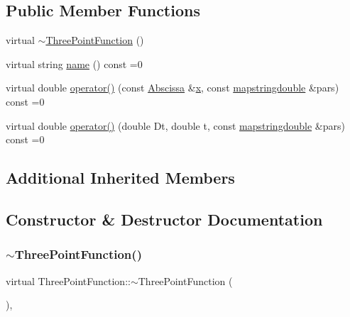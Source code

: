 \subsection*{Public Member Functions}
\begin{DoxyCompactItemize}
\item 
virtual \mbox{\hyperlink{classThreePointFunction_a0b8feef61409d9ad30c9296b6d137e3b}{$\sim$\+Three\+Point\+Function}} ()
\item 
virtual string \mbox{\hyperlink{classThreePointFunction_a4231093b53df2f82f4821a663ac8249f}{name}} () const =0
\item 
virtual double \mbox{\hyperlink{classThreePointFunction_a02550dd7bdee83aab6967d304bb40ff1}{operator()}} (const \mbox{\hyperlink{classAbscissa}{Abscissa}} \&\mbox{\hyperlink{old__edb_8cc_a63584b830e7aaacb521b11b72291a4bc}{x}}, const \mbox{\hyperlink{lib_2fitting__lib_2includes_8h_a647b481c557c7966517f753340a81d13}{mapstringdouble}} \&pars) const =0
\item 
virtual double \mbox{\hyperlink{classThreePointFunction_aa8a937bb564124ba5852898cd47e9fb3}{operator()}} (double Dt, double t, const \mbox{\hyperlink{lib_2fitting__lib_2includes_8h_a647b481c557c7966517f753340a81d13}{mapstringdouble}} \&pars) const =0
\end{DoxyCompactItemize}
\subsection*{Additional Inherited Members}


\subsection{Constructor \& Destructor Documentation}
\mbox{\label{classThreePointFunction_a0b8feef61409d9ad30c9296b6d137e3b}} 
\subsubsection{\texorpdfstring{$\sim$ThreePointFunction()}{~ThreePointFunction()}}
{\footnotesize\ttfamily virtual Three\+Point\+Function\+::$\sim$\+Three\+Point\+Function (\begin{DoxyParamCaption}{ }\end{DoxyParamCaption})\hspace{0.3cm}{\ttfamily [inline]}, {\ttfamily [virtual]}}




